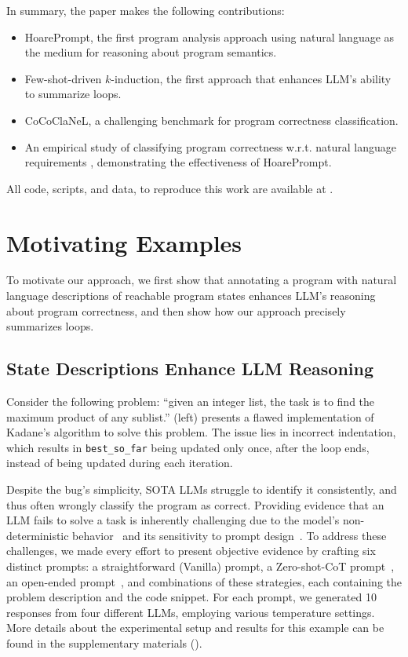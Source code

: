 \documentclass[sigconf]{acmart}
\newcommand{\projName}{HoarePrompt\xspace}
\newcommand{\benchName}{CoCoClaNeL\xspace}
\begin{document}
In summary, the paper makes the following contributions:
\begin{itemize}[nosep, topsep=0pt, partopsep=0pt, parsep=0pt, itemsep=0pt]
\item \projName, the first program analysis approach using natural language as the medium for reasoning about program semantics.
\item Few-shot-driven $k$-induction, the first approach that enhances LLM's ability to summarize loops.
\item \benchName, a challenging benchmark for program correctness classification.
\item An empirical study of classifying program correctness w.r.t. natural language requirements , demonstrating the effectiveness of \projName.
\end{itemize}
All code, scripts, and data, to reproduce this work are available at 
. 
\vspace{-2mm}
\section{Motivating Examples}
\label{sec:motivating}

To motivate our approach, we first show that annotating a program with natural language descriptions of reachable program states enhances LLM's reasoning about program correctness, and then show how our approach precisely summarizes loops.
\vspace{-2mm}
\subsection{State Descriptions Enhance LLM Reasoning}
\label{sec:motivating_states}

Consider the following problem: ``given an integer list, the task is to find the maximum product of any sublist.''  (left) presents a flawed implementation of Kadane's algorithm to solve this problem. The issue lies in incorrect indentation, which results in \texttt{best\_so\_far} being updated only once, after the loop ends, instead of being updated during each iteration.

Despite the bug's simplicity, SOTA LLMs struggle to identify it consistently, and thus often wrongly classify the program as correct. Providing evidence that an LLM fails to solve a task is inherently challenging due to the model's non-deterministic behavior~\cite{ouyang2025empirical} and its sensitivity to prompt design~\cite{sclar2023quantifying}. To address these challenges, we made every effort to present objective evidence by crafting six distinct prompts: a straightforward (Vanilla) prompt, a Zero-shot-CoT prompt~\cite{kojima2022large}, an open-ended prompt~\cite{arora2022ask}, and combinations of these strategies, each containing the problem description and the code snippet. For each prompt, we generated 10 responses from four different LLMs, employing various temperature settings. More details about the experimental setup and results for this example can be found in the supplementary materials ().
\end{document}
